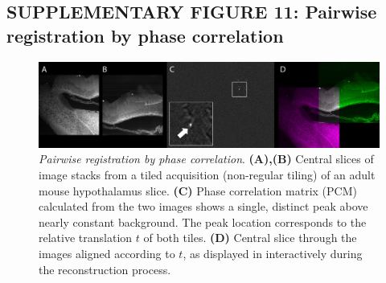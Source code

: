 \documentclass[]{spie}  %
\begin{document}
\subsection*{SUPPLEMENTARY FIGURE 11: Pairwise registration by phase correlation}
\vspace{1mm}
\begin{figure}[h!]
\includegraphics[width=\textwidth]{fig-stitching.jpg}
\vspace{-2.0mm}
\caption{\hspace{-0.5mm} \emph{Pairwise registration by phase correlation}. \textbf{(A),(B)} Central slices of image stacks from a tiled acquisition (non-regular tiling) of an adult mouse hypothalamus slice. \textbf{(C)} Phase correlation matrix (PCM) calculated from the two images shows a single, distinct peak above nearly constant background. The peak location corresponds to the relative translation $t$ of both tiles. \textbf{(D)} Central slice through the images aligned according to $t$, as displayed in interactively during the reconstruction process. 
}
\label{fig:sup-fig-stitching}
\end{figure}
\end{document}
